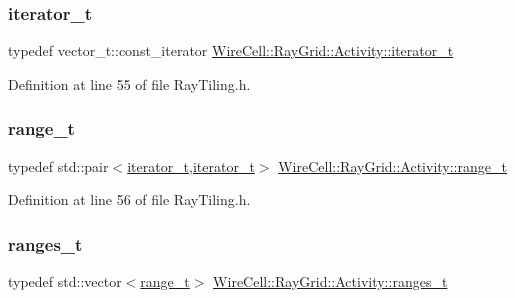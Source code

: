 \subsubsection{\texorpdfstring{iterator\+\_\+t}{iterator\_t}}
{\footnotesize\ttfamily typedef vector\+\_\+t\+::const\+\_\+iterator \hyperlink{class_wire_cell_1_1_ray_grid_1_1_activity_a4e6dc9c676d517a5819962b10a2638fe}{Wire\+Cell\+::\+Ray\+Grid\+::\+Activity\+::iterator\+\_\+t}}



Definition at line 55 of file Ray\+Tiling.\+h.

\mbox{\label{class_wire_cell_1_1_ray_grid_1_1_activity_af70e5851ae6fb8d76415033c0f90cb3e}} 
\subsubsection{\texorpdfstring{range\+\_\+t}{range\_t}}
{\footnotesize\ttfamily typedef std\+::pair$<$\hyperlink{class_wire_cell_1_1_ray_grid_1_1_activity_a4e6dc9c676d517a5819962b10a2638fe}{iterator\+\_\+t},\hyperlink{class_wire_cell_1_1_ray_grid_1_1_activity_a4e6dc9c676d517a5819962b10a2638fe}{iterator\+\_\+t}$>$ \hyperlink{class_wire_cell_1_1_ray_grid_1_1_activity_af70e5851ae6fb8d76415033c0f90cb3e}{Wire\+Cell\+::\+Ray\+Grid\+::\+Activity\+::range\+\_\+t}}



Definition at line 56 of file Ray\+Tiling.\+h.

\mbox{\label{class_wire_cell_1_1_ray_grid_1_1_activity_ac1614e7c72c06f7be7c03a80a25b024b}} 
\subsubsection{\texorpdfstring{ranges\+\_\+t}{ranges\_t}}
{\footnotesize\ttfamily typedef std\+::vector$<$\hyperlink{class_wire_cell_1_1_ray_grid_1_1_activity_af70e5851ae6fb8d76415033c0f90cb3e}{range\+\_\+t}$>$ \hyperlink{class_wire_cell_1_1_ray_grid_1_1_activity_ac1614e7c72c06f7be7c03a80a25b024b}{Wire\+Cell\+::\+Ray\+Grid\+::\+Activity\+::ranges\+\_\+t}}



